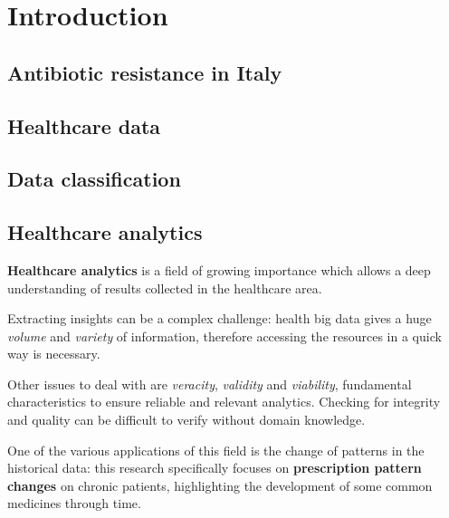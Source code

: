 \chapter{Introduction}
\section{Antibiotic resistance in Italy}


\section{Healthcare data}

\section{Data classification}

\section{Healthcare analytics}
\textbf{Healthcare analytics} is a field of growing importance which allows a deep understanding of results collected in the healthcare area. 

Extracting insights can be a complex challenge: health big data gives a huge \textit{volume} and \textit{variety} of information, therefore accessing the resources in a quick way is necessary. 

Other issues to deal with are \textit{veracity}, \textit{validity} and \textit{viability}, fundamental characteristics to ensure reliable and relevant analytics. Checking for integrity and quality can be difficult to verify without domain knowledge\cite{4vs}.

One of the various applications of this field is the change of patterns in the historical data: this research specifically focuses on \textbf{prescription pattern changes} on chronic patients, highlighting the development of some common medicines through time.


